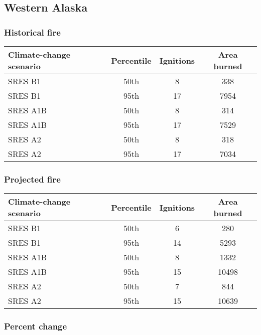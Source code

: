 \documentclass{article}\usepackage[]{graphicx}\usepackage[]{color}
\newcommand{\headcol}{\rowcolor{tableheadcolor}}
\begin{document}
\newpage
\subsection{Western Alaska}
\subsubsection{Historical fire}

\begin{table}[ht]
\centering
\begin{tabular}{lccc}
  \headcol 
 \toprule
Climate-change scenario & Percentile & Ignitions & Area burned \\ 
  \midrule
SRES B1 & 50th & 8 & 338 \\ 
  SRES B1 & 95th & 17 & 7954 \\ 
  SRES A1B & 50th & 8 & 314 \\ 
  SRES A1B & 95th & 17 & 7529 \\ 
  SRES A2 & 50th & 8 & 318 \\ 
  SRES A2 & 95th & 17 & 7034 \\ 
   \bottomrule
\end{tabular}
\end{table}


\subsubsection{Projected fire}

\begin{table}[ht]
\centering
\begin{tabular}{lccc}
  \headcol 
 \toprule
Climate-change scenario & Percentile & Ignitions & Area burned \\ 
  \midrule
SRES B1 & 50th & 6 & 280 \\ 
  SRES B1 & 95th & 14 & 5293 \\ 
  SRES A1B & 50th & 8 & 1332 \\ 
  SRES A1B & 95th & 15 & 10498 \\ 
  SRES A2 & 50th & 7 & 844 \\ 
  SRES A2 & 95th & 15 & 10639 \\ 
   \bottomrule
\end{tabular}
\end{table}


\subsubsection{Percent change}
\end{document}
